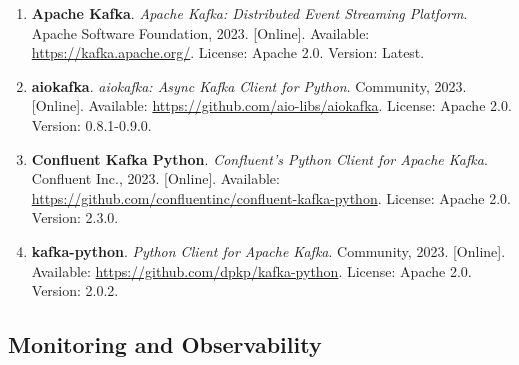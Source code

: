 \begin{enumerate}[resume]
    \item \textbf{Apache Kafka}. \textit{Apache Kafka: Distributed Event Streaming Platform}. 
    Apache Software Foundation, 2023. [Online]. Available: \url{https://kafka.apache.org/}. 
    License: Apache 2.0. Version: Latest.
    
    \item \textbf{aiokafka}. \textit{aiokafka: Async Kafka Client for Python}. 
    Community, 2023. [Online]. Available: \url{https://github.com/aio-libs/aiokafka}. 
    License: Apache 2.0. Version: 0.8.1-0.9.0.
    
    \item \textbf{Confluent Kafka Python}. \textit{Confluent's Python Client for Apache Kafka}. 
    Confluent Inc., 2023. [Online]. Available: \url{https://github.com/confluentinc/confluent-kafka-python}. 
    License: Apache 2.0. Version: 2.3.0.
    
    \item \textbf{kafka-python}. \textit{Python Client for Apache Kafka}. 
    Community, 2023. [Online]. Available: \url{https://github.com/dpkp/kafka-python}. 
    License: Apache 2.0. Version: 2.0.2.
\end{enumerate}

\subsection*{Monitoring and Observability}

